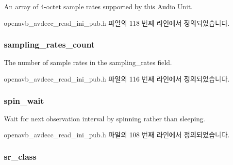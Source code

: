 An array of 4-\/octet sample rates supported by this Audio Unit. 



openavb\+\_\+avdecc\+\_\+read\+\_\+ini\+\_\+pub.\+h 파일의 118 번째 라인에서 정의되었습니다.

\subsubsection[{\texorpdfstring{sampling\+\_\+rates\+\_\+count}{sampling_rates_count}}]{ sampling\+\_\+rates\+\_\+count}\hypertarget{structopenavb__tl__data__cfg_a75b9a3bf65c881bc71b05d983793aa62}{}\label{structopenavb__tl__data__cfg_a75b9a3bf65c881bc71b05d983793aa62}


The number of sample rates in the sampling\+\_\+rates field. 



openavb\+\_\+avdecc\+\_\+read\+\_\+ini\+\_\+pub.\+h 파일의 116 번째 라인에서 정의되었습니다.

\subsubsection[{\texorpdfstring{spin\+\_\+wait}{spin_wait}}]{ spin\+\_\+wait}\hypertarget{structopenavb__tl__data__cfg_a5e39677fff9263d5891c77729b718142}{}\label{structopenavb__tl__data__cfg_a5e39677fff9263d5891c77729b718142}


Wait for next observation interval by spinning rather than sleeping. 



openavb\+\_\+avdecc\+\_\+read\+\_\+ini\+\_\+pub.\+h 파일의 108 번째 라인에서 정의되었습니다.

\subsubsection[{\texorpdfstring{sr\+\_\+class}{sr_class}}]{ sr\+\_\+class}\hypertarget{structopenavb__tl__data__cfg_a39d4e73b306d801de38536c43ef7a5e8}{}\label{structopenavb__tl__data__cfg_a39d4e73b306d801de38536c43ef7a5e8}


